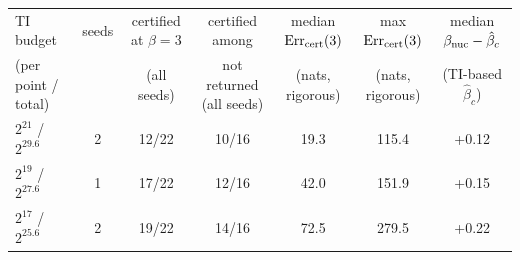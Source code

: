 \begin{tabular}{lcccccc}
\toprule
TI budget & seeds & certified at $\beta{=}3$ & certified among & median ${\rm Err}_{\rm cert}(3)$ & max ${\rm Err}_{\rm cert}(3)$ & median $\beta_{\rm nuc}-\hat\beta_c$ \\
(per point / total) & & (all seeds) & not returned (all seeds) & (nats, rigorous) & (nats, rigorous) & (TI-based $\hat\beta_c$) \\
\midrule
$2^{21}$ / $2^{29.6}$ & 2 & 12/22 & 10/16 & 19.3 & 115.4 & +0.12 \\
$2^{19}$ / $2^{27.6}$ & 1 & 17/22 & 12/16 & 42.0 & 151.9 & +0.15 \\
$2^{17}$ / $2^{25.6}$ & 2 & 19/22 & 14/16 & 72.5 & 279.5 & +0.22 \\
\bottomrule
\end{tabular}
